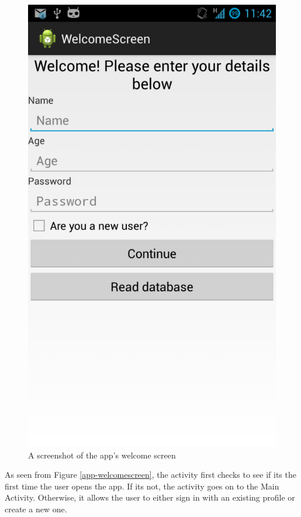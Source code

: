 \begin{figure}[h]
 \centering 
 \includegraphics[clip = true, trim = 0 320 0 60, scale=0.2]{welcome_screen}
 \caption{A screenshot of the app's welcome screen}
 \label{fig:welcomescreen-screenshot}
\end{figure}

As seen from Figure \ref{app-welcomescreen}, the activity first checks to see
if its the first time the user opens the app. If its not, the activity goes on
to the Main Activity. Otherwise, it allows the user to either sign in with an
existing profile or create a new one.

